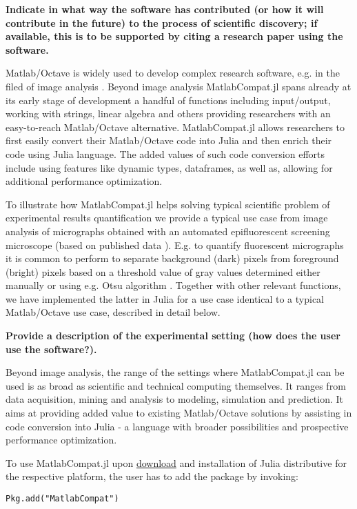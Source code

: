 \textbf{Indicate in what way the software has contributed (or how it will contribute in the future) to the process of scientific discovery; if available, this is to be supported by citing a research paper using the software.}

Matlab/Octave is widely used to develop complex research software, e.g. in the filed of image analysis \cite{Kiss_2014, 17076895}. Beyond image analysis MatlabCompat.jl spans already at its early stage of development a handful of functions including input/output, working with strings, linear algebra and others providing researchers with an easy-to-reach Matlab/Octave alternative. MatlabCompat.jl allows researchers to first easily convert their Matlab/Octave code into Julia and then enrich their code using Julia language. The added values of such code conversion efforts include using features like dynamic types, dataframes, as well as, allowing for additional performance optimization.

To illustrate how MatlabCompat.jl helps solving typical scientific problem of experimental results quantification we provide a typical use case from image analysis of micrographs obtained with an automated epifluorescent screening microscope (based on published data \cite{22787215}). E.g. to quantify fluorescent micrographs it is common to perform to separate background (dark) pixels from foreground (bright) pixels based on a threshold value of gray values determined either manually or using e.g. Otsu algorithm \cite{otsu1975threshold}. Together with other relevant functions, we have implemented the latter in Julia for a use case identical to a typical Matlab/Octave use case, described in detail below.

\textbf{Provide a description of the experimental setting (how does the user use the software?).}

Beyond image analysis, the range of the settings where MatlabCompat.jl can be used is as broad as scientific and technical computing themselves. It ranges from data acquisition, mining and analysis to modeling, simulation and prediction. It aims at providing added value to existing Matlab/Octave solutions by assisting in code conversion into Julia - a language with broader possibilities and prospective performance optimization.

To use MatlabCompat.jl upon \href{http://julialang.org/downloads/}{download} and installation of Julia distributive for the respective platform, the user has to add the package by invoking:

\verb|Pkg.add("MatlabCompat")|

